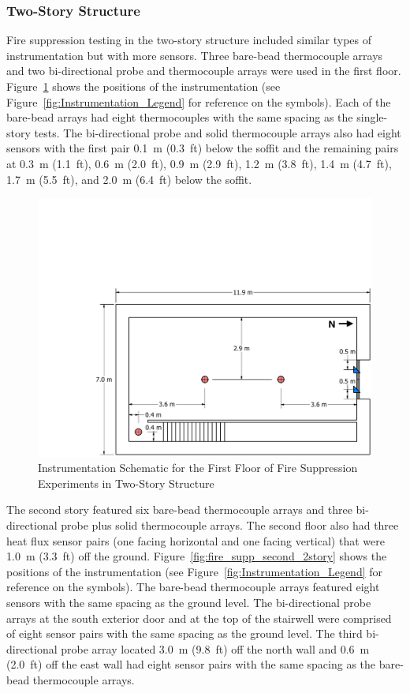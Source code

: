 \documentclass[12pt,oneside]{book}
\begin{document}
\subsubsection*{Two-Story Structure}

Fire suppression testing in the two-story structure included similar types of instrumentation but with more sensors. Three bare-bead thermocouple arrays and two bi-directional probe and thermocouple arrays were used in the first floor. Figure~\ref{fig:fire_supp_first_2story} shows the positions of the instrumentation (see Figure~\ref{fig:Instrumentation_Legend} for reference on the symbols). Each of the bare-bead arrays had eight thermocouples with the same spacing as the single-story tests. The bi-directional probe and solid thermocouple arrays also had eight sensors with the first pair 0.1~m (0.3~ft) below the soffit and the remaining pairs at 0.3~m (1.1~ft), 0.6~m (2.0~ft), 0.9~m (2.9~ft), 1.2~m (3.8~ft), 1.4~m (4.7~ft), 1.7~m (5.5~ft), and 2.0~m (6.4~ft) below the soffit.

\begin{figure}[!ht]
	\includegraphics[width=\columnwidth]{../../DelCo_2014_2015/Drawings/PDFs/CAFS/West_Structure_1st_Floor_Instrumentation}
	\caption{Instrumentation Schematic for the First Floor of Fire Suppression Experiments in Two-Story Structure}
	\label{fig:fire_supp_first_2story}
\end{figure}

The second story featured six bare-bead thermocouple arrays and three bi-directional probe plus solid thermocouple arrays. The second floor also had three heat flux sensor pairs (one facing horizontal and one facing vertical) that were 1.0~m (3.3~ft) off the ground. Figure~\ref{fig:fire_supp_second_2story} shows the positions of the instrumentation (see Figure~\ref{fig:Instrumentation_Legend} for reference on the symbols). The bare-bead thermocouple arrays featured eight sensors with the same spacing as the ground level. The bi-directional probe arrays at the south exterior door and at the top of the stairwell were comprised of eight sensor pairs with the same spacing as the ground level. The third bi-directional probe array located 3.0~m (9.8~ft) off the north wall and 0.6~m (2.0~ft) off the east wall had eight sensor pairs with the same spacing as the bare-bead thermocouple arrays.
\end{document}
